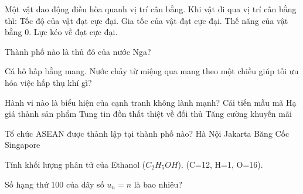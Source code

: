 \begin{ex}
    Một vật dao động điều hòa quanh vị trí cân bằng. Khi vật đi qua vị trí cân bằng thì:
    \choiceTF
    {\True Tốc độ của vật đạt cực đại.}
    {Gia tốc của vật đạt cực đại.}
    {\True Thế năng của vật bằng 0.}
    {Lực kéo về đạt cực đại.}
\end{ex}

\begin{ex}
    Thành phố nào là thủ đô của nước Nga?
\end{ex}

\begin{ex}
    Cá hô hấp bằng mang. Nước chảy từ miệng qua mang theo một chiều giúp tối ưu hóa việc hấp thụ khí gì?
\end{ex}

\begin{ex}
    Hành vi nào là biểu hiện của cạnh tranh không lành mạnh?
    \choice
    {Cải tiến mẫu mã}
    {Hạ giá thành sản phẩm}
    {\True Tung tin đồn thất thiệt về đối thủ}
    {Tăng cường khuyến mãi}
\end{ex}

\begin{ex}
    Tổ chức ASEAN được thành lập tại thành phố nào?
    \choice
    {Hà Nội}
    {Jakarta}
    {\True Băng Cốc}
    {Singapore}
\end{ex}

\begin{ex}
    Tính khối lượng phân tử của Ethanol ($C_2H_5OH$). (C=12, H=1, O=16).
\end{ex}

\begin{ex}
    Số hạng thứ 100 của dãy số $u_n = n$ là bao nhiêu?
\end{ex}

